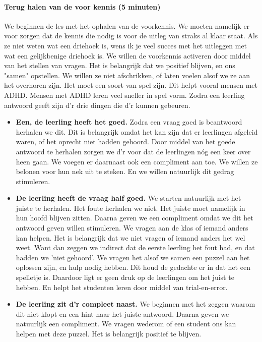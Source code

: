 \documentclass{article}
\begin{document}
                \paragraph{Terug halen van de voor kennis (5 minuten)}
                    We beginnen de les met het ophalen van de voorkennis. We moeten namelijk er voor zorgen dat de kennis die nodig is voor de uitleg van straks al klaar staat. Als ze niet weten wat een driehoek is, wens ik je veel succes met het uitleggen met wat een gelijkbenige driehoek is. We willen de voorkennis activeren door middel van het stellen van vragen. Het is belangrijk dat we positief blijven, en ons "samen" opstellen\cite{samen-boven-leads-to-better-results}. We willen ze niet afschrikken, of laten voelen alsof we ze aan het overhoren zijn. Het moet een soort van spel zijn. Dit helpt vooral mensen met ADHD. Mensen met ADHD leren veel sneller in spel vorm.\cite{ADHD-en-games}
                    Zodra een leerling antwoord geeft zijn d'r drie dingen die d'r kunnen gebeuren.
                    \begin{itemize}
                        \item{\textbf{Een, de leerling heeft het goed.}
                            Zodra een vraag goed is beantwoord herhalen we dit. Dit is belangrijk omdat het kan zijn dat er leerlingen afgeleid waren, of het oprecht niet hadden gehoord. Door middel van het goede antwoord te herhalen zorgen we d'r voor dat de leerlingen nóg een keer over heen gaan. We voegen er daarnaast ook een compliment aan toe. We willen ze belonen voor hun nek uit te steken. En we willen natuurlijk dit gedrag stimuleren. 
                        }
                        \item{\textbf{De leerling heeft de vraag half goed.}
                            We starten natuurlijk met het juiste te herhalen. Het foute herhalen we niet. Het juiste moet namelijk in hun hoofd blijven zitten. Daarna geven we een compliment omdat we dit het antwoord geven willen stimuleren. We vragen aan de klas of iemand anders kan helpen. Het is belangrijk dat we niet vragen of iemand anders het wel weet. Want dan zeggen we indirect dat de eerste leerling het fout had, en dat hadden we 'niet gehoord'. We vragen het alsof we samen een puzzel aan het oplossen zijn, en hulp nodig hebben. Dit houd de gedachte er in dat het een spelletje is. Daardoor ligt er geen druk op de leerlingen om het juist te hebben.\cite{games-help} En helpt het studenten leren door middel van trial-en-error.\cite{games-help}
                        }
                        \item{\textbf{De leerling zit d'r compleet naast.}
                            We beginnen met het zeggen waarom dit niet klopt en een hint naar het juiste antwoord. Daarna geven we natuurlijk een compliment. We vragen wederom of een student ons kan helpen met deze puzzel. Het is belangrijk positief te blijven.
                        }
                    \end{itemize}
\end{document}
